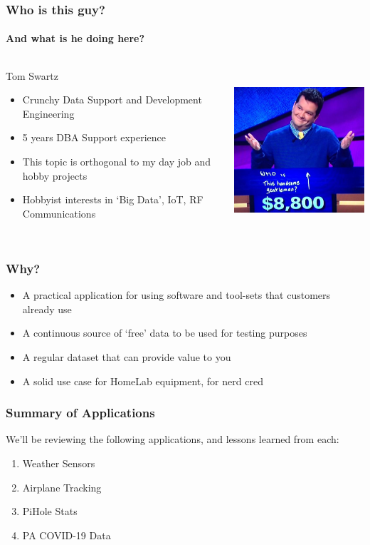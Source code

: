 \documentclass[aspectratio=169]{beamer}
\begin{document}
\begin{frame}
  \frametitle{Who is this guy?}
  \framesubtitle{And what is he doing here?}
  \begin{columns}[T]
    \begin{column}[T]{0.45\paperwidth}
      {\huge Tom Swartz}
      \vfill
      \begin{itemize}%
        \item{Crunchy Data Support and Development Engineering}
        \item{5 years DBA Support experience}
        \item{This topic is orthogonal to my day job and hobby projects}
        \item{Hobbyist interests in `Big Data', IoT, RF Communications}
      \end{itemize}
    \end{column}
    \begin{column}[T]{0.45\paperwidth}
      \includegraphics[height=6cm]{images/who-dat.jpg}
    \end{column}
  \end{columns}
\end{frame}

\begin{frame}[fragile]
  \frametitle{Why?}
  \begin{itemize}[<+->]
    \item{A practical application for using software and tool-sets that customers already use}
    \item{A continuous source of `free' data to be used for testing purposes}
    \item{A regular dataset that can provide value to you}
    \item{A solid use case for HomeLab equipment, for nerd cred}
 \end{itemize}
\end{frame}

\begin{frame}
  \frametitle{Summary of Applications}
  We'll be reviewing the following applications, and lessons learned from each:
  \begin{enumerate}
    \item{Weather Sensors}
    \item{Airplane Tracking}
    \item{PiHole Stats}
    \item{PA COVID-19 Data}
  \end{enumerate}
\end{frame}
\end{document}
